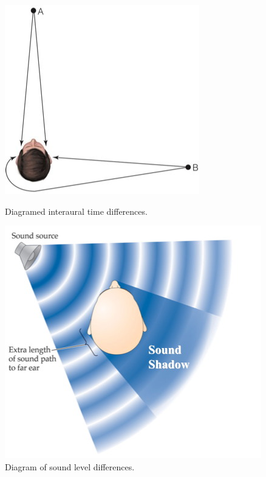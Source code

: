 \begin{figure}[htbp2]
  \begin{minipage}[b]{.45\linewidth}
    \centering
    \includegraphics[width=.8\linewidth]{images/binaural_interaural.jpg}
    \caption{Diagramed interaural time differences.}
    \label{fig:binaural_time_difference}
  \end{minipage}
  \hspace{0.5cm}
  \begin{minipage}[b]{0.5\linewidth}
    \centering
  \includegraphics[width=.9\linewidth]{images/binaural_level.jpg}
    \caption{Diagram of sound level differences.}
    \label{fig:binaural_sound_level}
  \end{minipage}
\end{figure}


